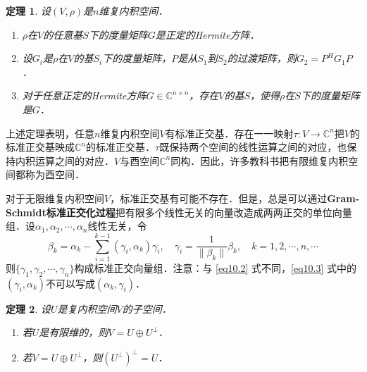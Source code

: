 \documentclass[a4paper,fontset=windows]{ctexbook}
\newtheorem{theorem}{定理}[chapter]
\theoremstyle{definition}
\begin{document}
\begin{theorem}
设$(V,\rho)$是$n$维复内积空间．
\begin{enumerate}
\item $\rho$在$V$的任意基$S$下的度量矩阵$G$是正定的Hermite方阵．

\item 设$G_i$是$\rho$在$V$的基$S_i$下的度量矩阵，$P$是从$S_1$到$S_2$的过渡矩阵，则$G_2=P^HG_1P$．

\item 对于任意正定的Hermite方阵$G\in\mathbb{C}^{n\times n}$，存在$V$的基$S$，使得$\rho$在$S$下的度量矩阵是$G$．
\end{enumerate}
\end{theorem}

上述定理表明，任意$n$维复内积空间$V$有标准正交基．存在一一映射$\tau:V\to\mathbb{C}^n$把$V$的标准正交基映成$\mathbb{C}^n$的标准正交基．$\tau$既保持两个空间的线性运算之间的对应，也保持内积运算之间的对应．$V$与酉空间$\mathbb{C}^n$同构．因此，许多教科书把有限维复内积空间都称为酉空间．

对于无限维复内积空间$V$，标准正交基有可能不存在．但是，总是可以通过{\bf Gram-Schmidt标准正交化过程}把有限多个线性无关的向量改造成两两正交的单位向量组．设$\alpha_1,\alpha_2,\cdots,\alpha_n$线性无关，令
\begin{equation}\label{eq10.3}
\beta_k=\alpha_k-\sum\limits_{i=1}^{k-1}(\gamma_i,\alpha_k)\gamma_i,\quad\gamma_i=\frac{1}{\|\beta_k\|}\beta_k,\quad k=1,2,\cdots,n,\cdots
\end{equation}
则$\{\gamma_1,\gamma_2,\cdots,\gamma_n\}$构成标准正交向量组．注意：与 \eqref{eq10.2} 式不同，\eqref{eq10.3} 式中的$(\gamma_i,\alpha_k)$不可以写成$(\alpha_k,\gamma_i)$．

\begin{theorem}
设$U$是复内积空间$V$的子空间．
\begin{enumerate}
\item 若$U$是有限维的，则$V=U\oplus U^\perp$．

\item 若$V=U\oplus U^\perp$，则$(U^\perp)^\perp=U$．
\end{enumerate}
\end{theorem}
\end{document}
